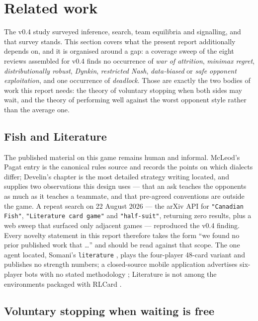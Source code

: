 \section{Related work}
\label{sec:related}

The v0.4 study surveyed inference, search, team equilibria and signalling, and
that survey stands. This section covers what the present report additionally
depends on, and it is organised around a gap: a coverage sweep of the eight
reviews assembled for v0.4 finds no occurrence of \emph{war of attrition},
\emph{minimax regret}, \emph{distributionally robust}, \emph{Dynkin},
\emph{restricted Nash}, \emph{data-biased} or \emph{safe opponent exploitation},
and one occurrence of \emph{deadlock}. Those are exactly the two bodies of work
this report needs: the theory of voluntary stopping when both sides may wait, and
the theory of performing well against the worst opponent style rather than the
average one.

\subsection{Fish and Literature}

The published material on this game remains human and informal. McLeod's Pagat
entry \cite{pagat} is the canonical rules source and records the points on which
dialects differ; Develin's chapter \cite{develin} is the most detailed strategy
writing located, and supplies two observations this design uses --- that an ask
teaches the opponents as much as it teaches a teammate, and that pre-agreed
conventions are outside the game. A repeat search on 22 August 2026 --- the arXiv
API for \texttt{"Canadian Fish"}, \texttt{"Literature card game"} and
\texttt{"half-suit"}, returning zero results, plus a web sweep that surfaced only
adjacent games --- reproduced the v0.4 finding. Every novelty statement in this
report therefore takes the form ``we found no prior published work that \dots''
and should be read against that scope. The one agent located, Somani's
\texttt{literature} \cite{somani}, plays the four-player 48-card variant and
publishes no strength numbers; a closed-source mobile application advertises
six-player bots with no stated methodology \cite{playstore}; Literature is not
among the environments packaged with RLCard \cite{rlcard}.

\subsection{Voluntary stopping when waiting is free}
\label{sec:related-stopping}

